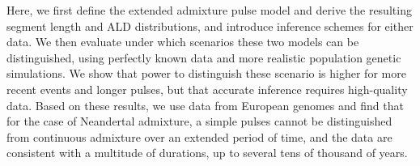 \documentclass[11pt]{article}
\begin{document}

Here, we first define the extended admixture pulse model and derive the resulting segment length and ALD distributions, and introduce inference schemes for either data. We then evaluate under which scenarios these two models can be distinguished, using  perfectly known data and more realistic population genetic simulations.  We show that power to distinguish these scenario is higher for more recent events and longer pulses, but that accurate inference requires high-quality data. Based on these results, we use data from European genomes  \citep{the_1000_genomes_project_consortium_global_2015} and find that for the case of Neandertal admixture, a simple pulses cannot be distinguished from continuous admixture over an extended period of time, and the data are consistent with a multitude of durations, up to several tens of thousand of years. 
\end{document}
